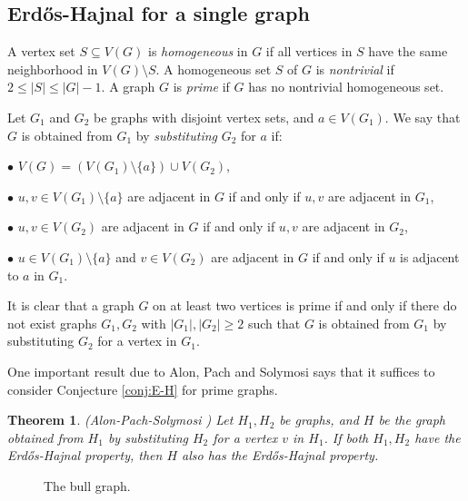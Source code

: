 \documentclass[a4paper,11pt]{article}
\newtheorem{theorem}{Theorem}[section]
\begin{document}
\subsection{Erd\H{o}s-Hajnal for a single graph}

A vertex set $S\subseteq V(G)$ is {\em homogeneous} in $G$ if all vertices in $S$ have the same neighborhood in $V(G)\setminus S$. A homogeneous set $S$ of $G$ is {\em nontrivial} if $2\leq |S|\leq |G|-1$. A graph $G$ is {\em prime} if $G$ has no nontrivial homogeneous set.

Let $G_1$ and $G_2$ be graphs with disjoint vertex sets, and $a\in V(G_1)$. We say that $G$ is obtained from $G_1$ by {\em substituting} $G_2$ for $a$ if:

$\bullet$ $V(G)=(V(G_1)\setminus \{a\})\cup V(G_2)$,

$\bullet$ $u,v\in V(G_1)\setminus \{a\}$ are adjacent in $G$ if and only if $u,v$ are adjacent in $G_1$,

$\bullet$ $u,v\in V(G_2)$ are adjacent in $G$ if and only if $u,v$ are adjacent in $G_2$,

$\bullet$ $u\in V(G_1)\setminus \{a\}$ and $v\in V(G_2)$ are adjacent in $G$ if and only if $u$ is adjacent to $a$ in $G_1$.

It is clear that a graph $G$ on at least two vertices is prime if and only if there do not exist graphs $G_1,G_2$ with $|G_1|,|G_2|\geq 2$ such that $G$ is obtained from $G_1$ by substituting $G_2$ for a vertex in $G_1$.

One important result due to Alon, Pach and Solymosi \cite{APS01} says that it suffices to consider Conjecture \ref{conj:E-H} for prime graphs.

\begin{theorem}\label{thm:E-H-substitute}
\textnormal{(Alon-Pach-Solymosi \cite{APS01})} Let $H_1,H_2$ be graphs, and $H$ be the graph obtained from $H_1$ by substituting $H_2$ for a vertex $v$ in $H_1$. If both $H_1,H_2$ have the Erd\H{o}s-Hajnal property, then $H$ also has the Erd\H{o}s-Hajnal property.
\end{theorem}

\begin{figure}[h!]
\centering
{}
\caption{The bull graph.}
\label{fig:bull}
\end{figure}
\end{document}
